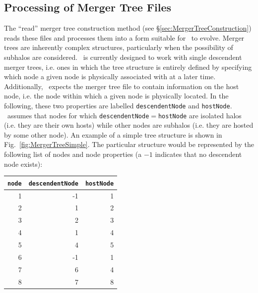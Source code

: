 \subsection{Processing of Merger Tree Files}

The ``read'' merger tree construction method (see \S\ref{sec:MergerTreeConstruction}) reads these files and processes them into a form suitable for \glc\ to evolve. Merger trees are inherently complex structures, particularly when the possibility of subhalos are considered. \glc\ is currently designed to work with single descendent merger trees, i.e. ones in which the tree structure is entirely defined by specifying which node a given node is physically associated with at a later time. Additionally, \glc\ expects the merger tree file to contain information on the host node, i.e. the node within which a given node is physically located. In the following, these two properties are labelled {\tt descendentNode} and {\tt hostNode}. \glc\ assumes that nodes for which {\tt descendentNode}$=${\tt hostNode} are isolated halos (i.e. they are their own hosts) while other nodes are subhalos (i.e. they are hosted by some other node). An example of a simple tree structure is shown in Fig.~\ref{fig:MergerTreeSimple}. The particular structure would be represented by the following list of nodes and node properties (a $-1$ indicates that no descendent node exists):
\begin{center}
\begin{tabular}{rrr}
\hline
{\tt node} & {\tt descendentNode} & {\tt hostNode} \\
\hline
1 & -1 & 1 \\
2 &  1 & 2 \\
3 &  2 & 3 \\
4 &  1 & 4 \\
5 &  4 & 5 \\
6 & -1 & 1 \\
7 &  6 & 4 \\
8 &  7 & 8 \\
\hline
\end{tabular}
\end{center}

